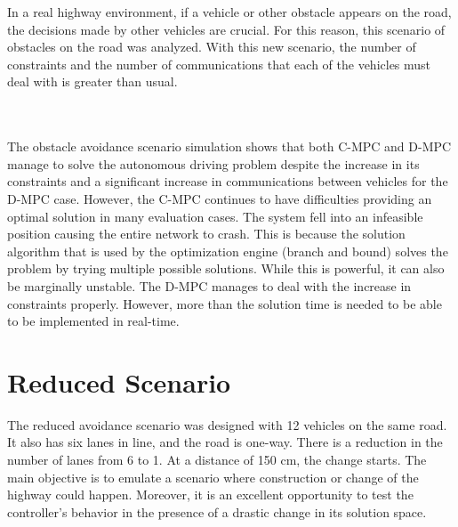 In a real highway environment, if a vehicle or other obstacle appears on the road, the decisions made by other vehicles are crucial. For this reason, this scenario of obstacles on the road was analyzed. With this new scenario, the number of constraints and the number of communications that each of the vehicles must deal with is greater than usual.

\\
\\
The obstacle avoidance scenario simulation shows that both C-MPC and D-MPC manage to solve the autonomous driving problem despite the increase in its constraints and a significant increase in communications between vehicles for the D-MPC case. However, the C-MPC continues to have difficulties providing an optimal solution in many evaluation cases. The system fell into an infeasible position causing the entire network to crash. This is because the solution algorithm that is used by the optimization engine (branch and bound) solves the problem by trying multiple possible solutions. While this is powerful, it can also be marginally unstable. The D-MPC manages to deal with the increase in constraints properly. However, more than the solution time is needed to be able to be implemented in real-time.


\newpage
\section{Reduced Scenario}

The reduced avoidance scenario was designed with 12 vehicles on the same road. It also has six lanes in line, and the road is one-way. There is a reduction in the number of lanes from 6 to 1. At a distance of 150 cm, the change starts. The main objective is to emulate a scenario where construction or change of the highway could happen. Moreover, it is an excellent opportunity to test the controller's behavior in the presence of a drastic change in its solution space. 

